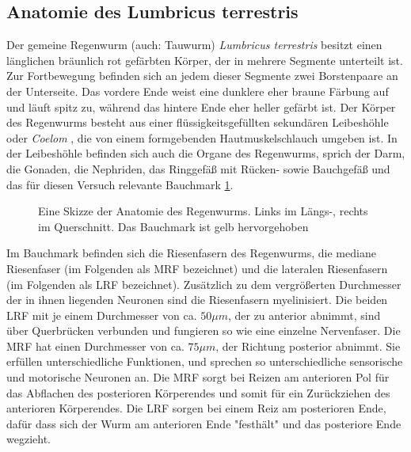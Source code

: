 \documentclass[11pt]{article}
\begin{document}
\subsection{Anatomie des Lumbricus terrestris}\label{anatomie} 
Der gemeine Regenwurm (auch: Tauwurm) \textit{Lumbricus terrestris} besitzt einen länglichen bräunlich rot gefärbten Körper, der in mehrere Segmente unterteilt ist. Zur Fortbewegung befinden sich an jedem dieser Segmente zwei Borstenpaare an der Unterseite. Das vordere Ende weist eine dunklere eher braune Färbung auf und läuft spitz zu, während das hintere Ende eher heller gefärbt ist. Der Körper des Regenwurms besteht aus einer flüssigkeitsgefüllten sekundären Leibeshöhle oder \textit{Coelom} , die von einem formgebenden Hautmuskelschlauch umgeben ist. In der Leibeshöhle befinden sich auch die Organe des Regenwurms, sprich der Darm, die Gonaden, die Nephriden, das Ringgefäß mit Rücken- sowie Bauchgefäß und das für diesen Versuch relevante Bauchmark \ref{bauchmark}. 
\begin{figure}[H]
\caption{Eine Skizze der Anatomie des Regenwurms. Links im Längs-, rechts im Querschnitt. Das Bauchmark ist gelb hervorgehoben}
\label{bauchmark}
\end{figure}
Im Bauchmark befinden sich die Riesenfasern des Regenwurms, die mediane Riesenfaser (im Folgenden als MRF bezeichnet) und die lateralen Riesenfasern (im Folgenden als LRF bezeichnet). Zusätzlich zu dem vergrößerten Durchmesser der in ihnen liegenden Neuronen sind die Riesenfasern myelinisiert. Die beiden LRF mit je einem Durchmesser von ca. $50 \mu m$, der zu anterior abnimmt, sind über Querbrücken verbunden und fungieren so wie eine einzelne Nervenfaser. Die MRF hat einen Durchmesser von ca. $75 \mu m$, der Richtung posterior abnimmt. Sie erfüllen unterschiedliche Funktionen, und sprechen so unterschiedliche sensorische und motorische Neuronen an. Die MRF sorgt bei Reizen am anterioren Pol für das Abflachen des posterioren Körperendes und somit für ein Zurückziehen des anterioren Körperendes. Die LRF sorgen bei einem Reiz am posterioren Ende, dafür dass sich der Wurm am anterioren Ende "{}festhält"{} und das posteriore Ende wegzieht.\cite{skript}
\end{document}
